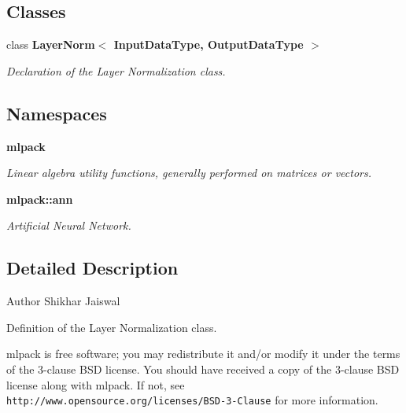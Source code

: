 \subsection*{Classes}
\begin{DoxyCompactItemize}
\item 
class \textbf{ Layer\+Norm$<$ Input\+Data\+Type, Output\+Data\+Type $>$}
\begin{DoxyCompactList}\small\item\em Declaration of the Layer Normalization class. \end{DoxyCompactList}\end{DoxyCompactItemize}
\subsection*{Namespaces}
\begin{DoxyCompactItemize}
\item 
 \textbf{ mlpack}
\begin{DoxyCompactList}\small\item\em Linear algebra utility functions, generally performed on matrices or vectors. \end{DoxyCompactList}\item 
 \textbf{ mlpack\+::ann}
\begin{DoxyCompactList}\small\item\em Artificial Neural Network. \end{DoxyCompactList}\end{DoxyCompactItemize}


\subsection{Detailed Description}
\begin{DoxyAuthor}{Author}
Shikhar Jaiswal
\end{DoxyAuthor}
Definition of the Layer Normalization class.

mlpack is free software; you may redistribute it and/or modify it under the terms of the 3-\/clause B\+SD license. You should have received a copy of the 3-\/clause B\+SD license along with mlpack. If not, see {\tt http\+://www.\+opensource.\+org/licenses/\+B\+S\+D-\/3-\/\+Clause} for more information. 